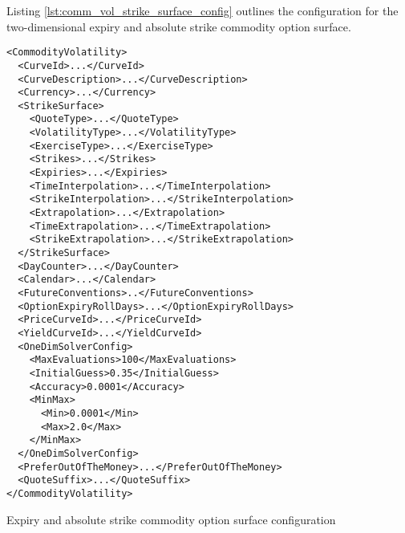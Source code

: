 Listing \ref{lst:comm_vol_strike_surface_config} outlines the configuration for the two-dimensional expiry and absolute strike commodity option surface.

\begin{longlisting}
\begin{verbatim}
<CommodityVolatility>
  <CurveId>...</CurveId>
  <CurveDescription>...</CurveDescription>
  <Currency>...</Currency>
  <StrikeSurface>
    <QuoteType>...</QuoteType>
    <VolatilityType>...</VolatilityType>
    <ExerciseType>...</ExerciseType>
    <Strikes>...</Strikes>
    <Expiries>...</Expiries>
    <TimeInterpolation>...</TimeInterpolation>
    <StrikeInterpolation>...</StrikeInterpolation>
    <Extrapolation>...</Extrapolation>
    <TimeExtrapolation>...</TimeExtrapolation>
    <StrikeExtrapolation>...</StrikeExtrapolation>
  </StrikeSurface>
  <DayCounter>...</DayCounter>
  <Calendar>...</Calendar>
  <FutureConventions>..</FutureConventions>
  <OptionExpiryRollDays>...</OptionExpiryRollDays>
  <PriceCurveId>...</PriceCurveId>
  <YieldCurveId>...</YieldCurveId>
  <OneDimSolverConfig>
    <MaxEvaluations>100</MaxEvaluations>
    <InitialGuess>0.35</InitialGuess>
    <Accuracy>0.0001</Accuracy>
    <MinMax>
      <Min>0.0001</Min>
      <Max>2.0</Max>
    </MinMax>
  </OneDimSolverConfig>
  <PreferOutOfTheMoney>...</PreferOutOfTheMoney>
  <QuoteSuffix>...</QuoteSuffix>
</CommodityVolatility>
\end{verbatim}
\caption{Expiry and absolute strike commodity option surface configuration}
\label{lst:comm_vol_strike_surface_config}
\end{longlisting}

